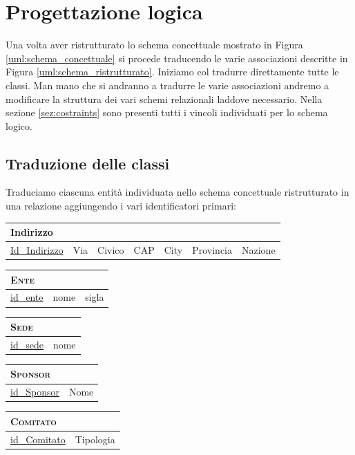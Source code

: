 \section{Progettazione logica}
Una volta aver ristrutturato lo schema concettuale mostrato in Figura \ref{uml:schema_concettuale} si procede traducendo le varie associazioni descritte in Figura \ref{uml:schema_ristrutturato}. Iniziamo col tradurre direttamente tutte le classi. Man mano che si andranno a tradurre le varie associazioni andremo a modificare la struttura dei vari schemi relazionali laddove necessario. Nella sezione \ref{sez:costraints} sono presenti tutti i vincoli individuati per lo schema logico.
\subsection{Traduzione delle classi}
Traduciamo ciascuna entità individuata nello schema concettuale ristrutturato in una relazione aggiungendo i vari identificatori primari:

	\begin{tabular}{|l|l|l|l|l|l|l|}
		\multicolumn{7}{l}{Indirizzo} \\
		\hline
		\underline{Id\_Indirizzo} & Via & Civico & CAP & City & Provincia & Nazione \\ \hline
	\end{tabular}
	
	\begin{tabular}{|l|l|l|}
		\multicolumn{3}{l}{\textsc{Ente}}\\ \hline
		\underline{id\_ente} & nome & sigla \\ \hline
	\end{tabular}


	\begin{tabular}{|l|l|}
		\multicolumn{2}{l}{\textsc{Sede}} \\ \hline
		\underline{id\_sede} & nome \\ \hline
	\end{tabular}


	\begin{tabular}{|l|l|}
		\multicolumn{2}{l}{\textsc{Sponsor}} \\ \hline
		\underline{id\_Sponsor} & Nome \\ \hline
	\end{tabular}


	\begin{tabular}{|l|l|}
		\multicolumn{2}{l}{\textsc{Comitato}} \\ \hline
		\underline{id\_Comitato} & Tipologia \\ \hline
	\end{tabular}


